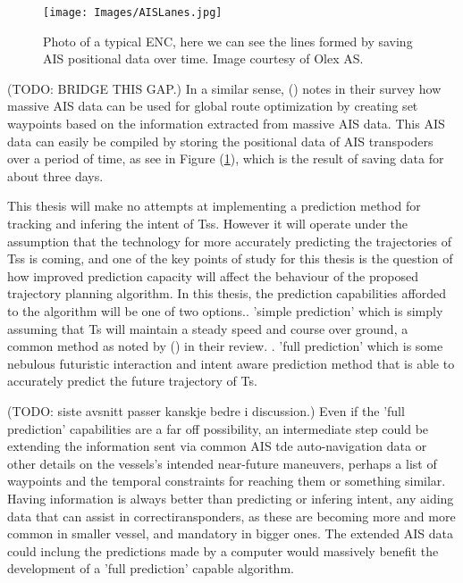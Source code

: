 \begin{figure}[ht!]
    \texttt{[image: Images/AISLanes.jpg]}
    \centering
    \caption{Photo of a typical ENC, here we can see the lines formed by saving AIS positional data over time. Image courtesy of Olex AS.}
    \label{FIG: AIS lanes}
\end{figure}


(TODO: BRIDGE THIS GAP.)\newline
In a similar sense, (\cite{zhang2021collision}) notes in their survey how massive AIS data can be used for global route optimization by
creating set waypoints based on the information extracted from massive AIS data.
This AIS data can easily be compiled by storing the positional data of AIS transpoders over a period of time, as see in Figure (\ref{FIG: AIS lanes}), which
is the result of saving data for about three days.


This thesis will make no attempts at implementing a prediction method for tracking and infering the intent of \gls{Ts}s. However it will
operate under the assumption that the technology for more accurately predicting the trajectories of \gls{Ts}s is coming, and one of the key points
of study for this thesis is the question of how improved prediction capacity will affect the behaviour of the proposed trajectory planning algorithm.
In this thesis, the prediction capabilities afforded to the algorithm will be one of two options.. 'simple prediction' which is simply assuming that \gls{Ts} will maintain a steady speed and course over ground, 
a common method as noted by (\cite{huang2020ship}) in their review. . 'full prediction' which is some nebulous futuristic interaction and intent aware prediction method that is able to accurately predict the
future trajectory of \gls{Ts}.

(TODO: siste avsnitt passer kanskje bedre i discussion.)\newline
Even if the 'full prediction' capabilities are a far off possibility, an intermediate step could be extending the information sent via
common AIS tde auto-navigation data or other details on the vessels's intended near-future maneuvers, perhaps a list of waypoints and the temporal
constraints for reaching them or something similar. Having information is always better than predicting or infering intent, any aiding data that can
assist in correctiransponders, as these are becoming more and more common in smaller vessel, and mandatory in bigger ones. The extended AIS data could
inclung the predictions made by a computer would massively benefit the development of a 'full prediction' capable algorithm.



\newpage